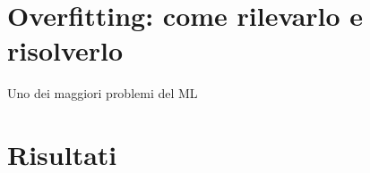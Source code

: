 \section{Overfitting: come rilevarlo e risolverlo}
Uno dei maggiori problemi del ML 



\section{Risultati}
